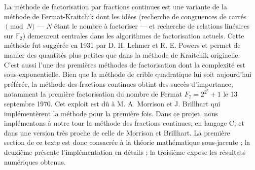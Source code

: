 
La méthode de factorisation par fractions continues est une variante de la
méthode de Fermat-Kraitchik dont les idées (recherche de congruences de carrés
$\pmod{N}$ — $N$ étant le nombre à factoriser — et recherche de relations
linéaires sur $\mathbb{F}_2$) demeurent centrales dans les algorithmes de
factorisation actuels. Cette méthode fut suggérée en 1931 par D. H. Lehmer et
R. E. Powers et permet de manier des quantités plus petites que dans la méthode
de Kraitchik originelle. C'est aussi l'une des premières méthodes de
factorisation dont la complexité est sous-exponentielle. Bien que la méthode
de crible quadratique lui soit aujourd'hui préférée, la méthode des fractions
continues obtint des succès d'importance, notamment la première factorisation
du nombre de Fermat $F_7 = 2^{2^7} + 1$ le 13 septembre 1970. Cet exploit est
dû à M. A. Morrison et J. Brillhart qui implémentèrent la méthode pour la
première fois. Dans ce projet, nous implémentons à notre tour la méthode des
fractions continues, en langage C, et dans une version très proche de celle de
Morrison et Brillhart. La première section de ce texte est donc consacrée à la
théorie mathématique sous-jacente ; la deuxième présente l'implémentation en
détails ; la troisième expose les résultats numériques obtenus.
